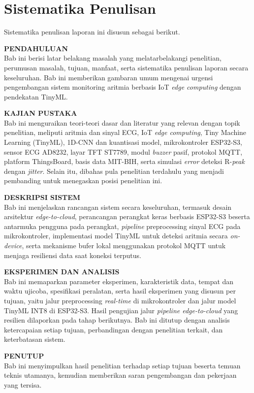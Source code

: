 \section{Sistematika Penulisan}

Sistematika penulisan laporan ini disusun sebagai berikut.

\noindent
\textbf{PENDAHULUAN}\\
\hspace*{1.5cm} Bab ini berisi latar belakang masalah yang melatarbelakangi penelitian, perumusan masalah, tujuan, manfaat, serta sistematika penulisan laporan secara keseluruhan. Bab ini memberikan gambaran umum mengenai urgensi pengembangan sistem monitoring aritmia berbasis IoT \textit{edge computing} dengan pendekatan TinyML.

\noindent
\textbf{KAJIAN PUSTAKA}\\
\hspace*{1.5cm} Bab ini menguraikan teori-teori dasar dan literatur yang relevan dengan topik penelitian, meliputi aritmia dan sinyal ECG, IoT \textit{edge computing}, Tiny Machine Learning (TinyML), 1D-CNN dan kuantisasi model, mikrokontroler ESP32-S3, sensor ECG AD8232, layar TFT ST7789, modul \textit{buzzer} pasif, protokol MQTT, platform ThingsBoard, basis data MIT-BIH, serta simulasi \textit{error} deteksi R-\textit{peak} dengan \textit{jitter}. Selain itu, dibahas pula penelitian terdahulu yang menjadi pembanding untuk menegaskan posisi penelitian ini.

\noindent
\textbf{DESKRIPSI SISTEM}\\
\hspace*{1.5cm} Bab ini menjelaskan rancangan sistem secara keseluruhan, termasuk desain arsitektur \textit{edge-to-cloud}, perancangan perangkat keras berbasis ESP32-S3 beserta antarmuka pengguna pada perangkat, \textit{pipeline} preprocessing sinyal ECG pada mikrokontroler, implementasi model TinyML untuk deteksi aritmia secara \textit{on-device}, serta mekanisme bufer lokal menggunakan protokol MQTT untuk menjaga resiliensi data saat koneksi terputus.

\noindent
\textbf{EKSPERIMEN DAN ANALISIS}\\
\hspace*{1.5cm} Bab ini memaparkan parameter eksperimen, karakteristik data, tempat dan waktu ujicoba, spesifikasi peralatan, serta hasil eksperimen yang disusun per tujuan, yaitu jalur preprocessing \textit{real-time} di mikrokontroler dan jalur model TinyML INT8 di ESP32-S3. Hasil pengujian jalur \textit{pipeline edge-to-cloud} yang resilien dilaporkan pada tahap berikutnya. Bab ini ditutup dengan analisis ketercapaian setiap tujuan, perbandingan dengan penelitian terkait, dan keterbatasan sistem.

\noindent
\textbf{PENUTUP}\\
\hspace*{1.5cm} Bab ini menyimpulkan hasil penelitian terhadap setiap tujuan beserta temuan teknis utamanya, kemudian memberikan saran pengembangan dan pekerjaan yang tersisa.
